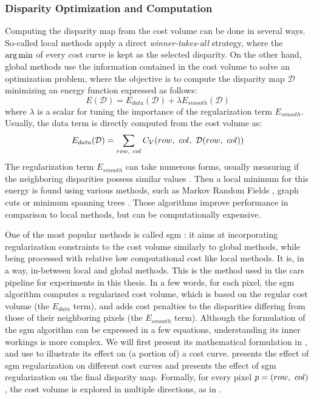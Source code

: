 \subsubsection{Disparity Optimization and Computation}\label{sec:cost_volume_optimization}
Computing the disparity map from the cost volume can be done in several ways. So-called local methods apply a direct \textit{winner-takes-all} strategy, where the $\operatorname*{arg\,min}$ of every cost curve is kept as the selected disparity. On the other hand, global methods use the information contained in the cost volume to solve an optimization problem, where the objective is to compute the disparity map $\mathcal{D}$ minimizing an energy function expressed as follows:
\begin{equation}
    E(\mathcal{D}) = E_{data}(\mathcal{D}) + \lambda E_{smooth}(\mathcal{D})
\end{equation}
where $\lambda$ is a scalar for tuning the importance of the regularization term $E_{smooth}$. Usually, the data term is directly computed from the cost volume as:
\begin{equation}\label{eq:global_methods}
    E_{data}(\mathcal{D}) = \sum_{row,~col}C_V(row, ~col,~\mathcal{D}(row, ~col))
\end{equation}
The regularization term $E_{smooth}$ can take numerous forms, usually measuring if the neighboring disparities possess similar values \cite{scharstein_taxonomy_2001}. Then a local minimum for this energy is found using various methods, such as Markov Random Fields \cite{boykov_markov_1998, sun_stereo_2003}, graph cuts \cite{kolmogorov_computing_2001} or minimum spanning trees \cite{zureiki_stereo_2008, qingxiong_yang_non-local_2012}. Those algorithms improve performance in comparison to local methods, but can be computationally expensive.

One of the most popular methods is called \acrfull{sgm} \cite{hirschmuller_accurate_2005}: it aims at incorporating regularization constraints to the cost volume similarly to global methods, while being processed with relative low computational cost like local methods. It is, in a way, in-between local and global methods. This is the method used in the \acrshort{cars} pipeline for experiments in this thesis. In a few words, for each pixel, the \acrshort{sgm} algorithm computes a regularized cost volume, which is based on the regular cost volume (the $E_{data}$ term), and adds cost penalties to the disparities differing from those of their neighboring pixels (the $E_{smooth}$ term). Although the formulation of the \acrshort{sgm} algorithm can be expressed in a few equations, understanding its inner workings is more complex. We will first present its mathematical formulation in , and use  to illustrate its effect on (a portion of) a cost curve.  presents the effect of \acrshort{sgm} regularization on different cost curves and  presents the effect of \acrshort{sgm} regularization on the final disparity map. Formally, for every pixel $p=(row, ~col)$, the cost volume is explored in multiple directions, as in .

